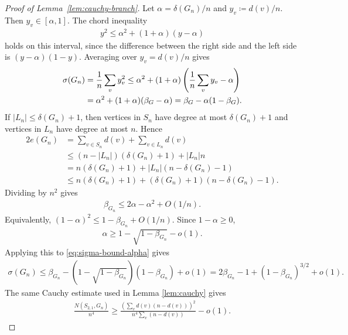\documentclass[10pt,a4paper]{article}
\begin{document}
\begin{proof}[Proof of Lemma~\ref{lem:cauchy-branch}]
Let $\alpha=\delta(G_n)/n$ and $y_v\coloneqq d(v)/n$.  Then $y_v\in[\alpha,1]$.  The chord inequality
\begin{align*}
  y^2\le \alpha^2+(1+\alpha)(y-\alpha)
\end{align*}
holds on this interval, since the difference between the right side and the left side is $(y-\alpha)(1-y)$.  Averaging over $y_v=d(v)/n$ gives
\begin{align}\label{eq:sigma-bound-alpha}
  \sigma(G_n)&=\frac1n\sum_v y_v^2
  \le \alpha^2+(1+\alpha)\left(\frac1n\sum_v y_v-\alpha\right)\notag\\
  &=\alpha^2+(1+\alpha)(\beta_G-\alpha)
  =\beta_G-\alpha(1-\beta_G).
\end{align}
If $|L_n|\le\delta(G_n)+1$, then vertices in $S_n$ have degree at most $\delta(G_n)+1$ and vertices in $L_n$ have degree at most $n$.  Hence
\begin{align*}
2e(G_n)&=\sum_{v\in S_n}d(v)+\sum_{v\in L_n}d(v)\\
&\le(n-|L_n|)(\delta(G_n)+1)+|L_n|n\\
&=n(\delta(G_n)+1)+|L_n|(n-\delta(G_n)-1)\\
&\le n(\delta(G_n)+1)+(\delta(G_n)+1)(n-\delta(G_n)-1).
\end{align*}
Dividing by $n^2$ gives
\begin{align}\label{eq:alpha-beta-bound}
  \beta_{G_n}\le2\alpha-\alpha^2+O(1/n).
\end{align}
Equivalently, $(1-\alpha)^2\le1-\beta_{G_n}+O(1/n)$.  Since $1-\alpha\ge0$,
\begin{align*}
  \alpha\ge1-\sqrt{1-\beta_{G_n}}-o(1).
\end{align*}
Applying this to \eqref{eq:sigma-bound-alpha} gives
\begin{align}\label{eq:sigma-upper-Gn}
  \sigma({G_n})\le \beta_{G_n}-(1-\sqrt{1-\beta_{G_n}})(1-\beta_{G_n})+o(1)
  =2\beta_{G_n}-1+(1-\beta_{G_n})^{3/2}+o(1).
\end{align}
The same Cauchy estimate used in Lemma \ref{lem:cauchy} gives
\begin{align}\label{eq:cauchy-branch-estimate}
  \frac{N(S_{2,1},G_n)}{n^4}
  \ge
  \frac{\left(\sum_v d(v)(n-d(v))\right)^2}
       {n^4\sum_v(n-d(v))}-o(1).
\end{align}

\end{proof}
\end{document}
